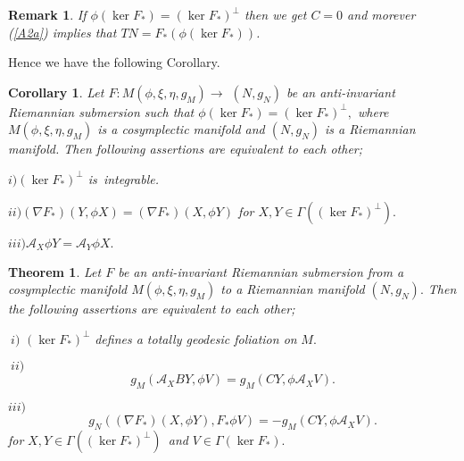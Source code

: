 \documentclass{amsart}
\newtheorem{theorem}{Theorem}
\theoremstyle{plain}
\newtheorem{corollary}{Corollary}
\newtheorem{remark}{Remark}
\numberwithin{equation}{section}
\begin{document}
\begin{remark}
If $\phi (\ker F_{\ast })=(\ker F_{\ast })^{\bot }$ then we get $C=0$ and
morever (\ref{A2a}) implies that $TN=F_{\ast }(\phi (\ker F_{\ast }))$.
\end{remark}

Hence we have the following Corollary.

\begin{corollary}
Let $F:M(\phi ,\xi ,\eta ,g_{M})\rightarrow $ $(N,g_{N})$ be an
anti-invariant Riemannian submersion such that $\phi (\ker F_{\ast })=(\ker
F_{\ast })^{\bot },$ where $M(\phi ,\xi ,\eta ,g_{M})$ is a cosymplectic
manifold and $(N,g_{N})$ is a Riemannian manifold. Then following assertions
are equivalent to each other;

$i)(\ker F_{\ast })^{\bot }$ is\ integrable\textit{.}

$ii)(\nabla F_{\ast })(Y,\phi X)=(\nabla F_{\ast })(X,\phi Y)$ for $X,Y\in
\Gamma ((\ker F_{\ast })^{\bot }).$

$iii)\mathcal{A}_{X}\phi Y=\mathcal{A}_{Y}\phi X.$
\end{corollary}

\begin{theorem}
Let $F$ be an anti-invariant Riemannian submersion from a cosymplectic
manifold $M(\phi ,\xi ,\eta ,g_{M})$ to a Riemannian manifold $(N,g_{N}).$
Then the following assertions are equivalent to each other;
\end{theorem}

$\ i)$ $(\ker F_{\ast })^{\bot }$ \textit{defines a totally geodesic
foliation on }$M.$

$\ ii)$ 
\begin{equation*}
g_{M}(\mathcal{A}_{X}BY,\phi V)=g_{M}(CY,\phi \mathcal{A}_{X}V).
\end{equation*}

$iii)$\begin{equation*}
g_{N}((\nabla F_{\ast })(X,\phi Y),F_{\ast }\phi V)=-g_{M}(CY,\phi \mathcal{A}_{X}V).
\end{equation*}\textit{for }$X,Y\in \Gamma ((\ker F_{\ast })^{\bot })$\textit{\ and }$V\in
\Gamma (\ker F_{\ast }).$
\end{document}
